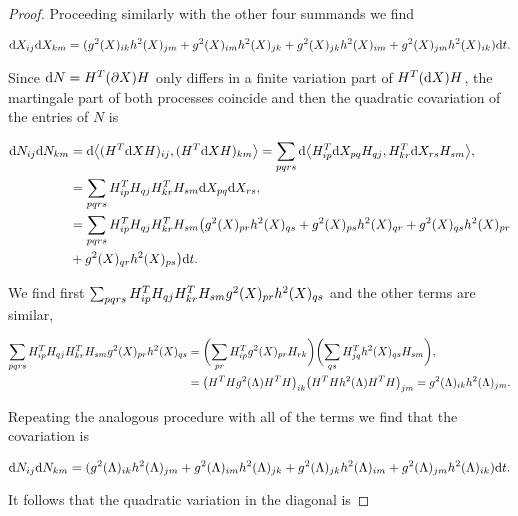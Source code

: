 \begin{proof}
    Proceeding similarly with the other four summands we find

    \begin{align*}
        \mathrm d X_{ij} \mathrm d X_{km} = (g^2(X)_{ik}h^2(X)_{jm} + g^2(X)_{im}h^2(X)_{jk} + g^2(X)_{jk}h^2(X)_{im} + g^2(X)_{jm}h^2(X)_{ik})\mathrm d t.
    \end{align*}

    Since $\mathrm d N = H^T(\partial X)H$ only differs in a finite variation part of $H^T(\mathrm d X) H$, the martingale part of both processes coincide and then the quadratic covariation of the entries of $N$ is

    \begin{align*}
        \mathrm d N_{ij}\mathrm d N_{km} &= \mathrm d \bigl< (H^T\mathrm d X H)_{ij},(H^T \mathrm d X H)_{km} \bigr> = \sum_{pqrs} \mathrm d\bigl< H^T_{ip}\mathrm d X_{pq} H_{qj}, H^T_{kr}\mathrm d X_{rs} H_{sm} \bigr>, \\
        &= \sum_{pqrs} H^T_{ip}H_{qj}H^T_{kr}H_{sm}\mathrm d X_{pq} \mathrm d X_{rs},\\ 
        &= \sum_{pqrs} H^T_{ip}H_{qj}H^T_{kr}H_{sm}\bigl(g^2(X)_{pr}h^2(X)_{qs} + g^2(X)_{ps}h^2(X)_{qr} + g^2(X)_{qs}h^2(X)_{pr} \\ 
        &+ g^2(X)_{qr}h^2(X)_{ps}\bigr)\mathrm d t.
    \end{align*}

    We find first $\sum_{pqrs} H^T_{ip}H_{qj}H^T_{kr}H_{sm}g^2(X)_{pr}h^2(X)_{qs}$ and the other terms are similar,

    \begin{align*}
        \sum_{pqrs} H^T_{ip}H_{qj}H^T_{kr}H_{sm}g^2(X)_{pr}h^2(X)_{qs} &= \biggl(\sum_{pr}H^T_{ip}g^2(X)_{pr}H_{rk}\biggr)\biggl(\sum_{qs}H^T_{jq}h^2(X)_{qs}H_{sm}\biggr),\\
        &= \bigl( H^THg^2(\Lambda)H^TH\bigr)_{ik}\bigl(H^THh^2(\Lambda)H^TH\bigr)_{jm} = g^2(\Lambda)_{ik}h^2(\Lambda)_{jm}.
    \end{align*}

    Repeating the analogous procedure with all of the terms we find that the covariation is

    \begin{equation*} \label{eq:quadvarN}
        \mathrm d N_{ij}\mathrm d N_{km} = (g^2(\Lambda)_{ik}h^2(\Lambda)_{jm} + g^2(\Lambda)_{im}h^2(\Lambda)_{jk} + g^2(\Lambda)_{jk}h^2(\Lambda)_{im} + g^2(\Lambda)_{jm}h^2(\Lambda)_{ik})\mathrm d t.
    \end{equation*}

    It follows that the quadratic variation in the diagonal is


\end{proof}
